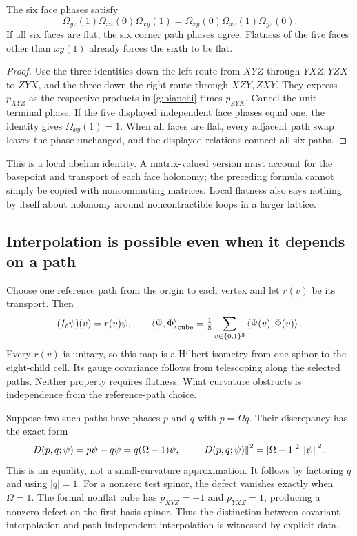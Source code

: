 \begin{proposition}
The six face phases satisfy
\begin{equation}
 \Omega_{yz}(1)\Omega_{xz}(0)\Omega_{xy}(1)
 =\Omega_{xy}(0)\Omega_{xz}(1)\Omega_{yz}(0).
 \label{g:bianchi}
\end{equation}
If all six faces are flat, the six corner path phases agree. Flatness of the five faces other than $xy(1)$ already forces the sixth to be flat.
\end{proposition}
\begin{proof}
Use the three identities down the left route from $XYZ$ through $YXZ,YZX$ to $ZYX$, and the three down the right route through $XZY,ZXY$. They express $p_{XYZ}$ as the respective products in \eqref{g:bianchi} times $p_{ZYX}$. Cancel the unit terminal phase. If the five displayed independent face phases equal one, the identity gives $\Omega_{xy}(1)=1$. When all faces are flat, every adjacent path swap leaves the phase unchanged, and the displayed relations connect all six paths.
\end{proof}

This is a local abelian identity. A matrix-valued version must account for the basepoint and transport of each face holonomy; the preceding formula cannot simply be copied with noncommuting matrices. Local flatness also says nothing by itself about holonomy around noncontractible loops in a larger lattice.

\subsection{Interpolation is possible even when it depends on a path}
Choose one reference path from the origin to each vertex and let $r(v)$ be its transport. Then
\[
 (I_\ell\psi)(v)=r(v)\psi,
 \qquad
 \left\langle\Psi,\Phi\right\rangle_{\rm cube}
 =\tfrac18\sum_{v\in\{0,1\}^3}\left\langle\Psi(v),\Phi(v)\right\rangle.
\]
Every $r(v)$ is unitary, so this map is a Hilbert isometry from one spinor to the eight-child cell. Its gauge covariance follows from telescoping along the selected paths. Neither property requires flatness. What curvature obstructs is independence from the reference-path choice.

Suppose two such paths have phases $p$ and $q$ with $p=\Omega q$. Their discrepancy has the exact form
\begin{equation}
 D(p,q;\psi)=p\psi-q\psi=q(\Omega-1)\psi,
 \qquad
 \left\lVert D(p,q;\psi)\right\rVert^2=|\Omega-1|^2\left\lVert\psi\right\rVert^2.
 \label{g:curvature-defect}
\end{equation}
This is an equality, not a small-curvature approximation. It follows by factoring $q$ and using $|q|=1$. For a nonzero test spinor, the defect vanishes exactly when $\Omega=1$. The formal nonflat cube has $p_{XYZ}=-1$ and $p_{YXZ}=1$, producing a nonzero defect on the first basis spinor. Thus the distinction between covariant interpolation and path-independent interpolation is witnessed by explicit data.

